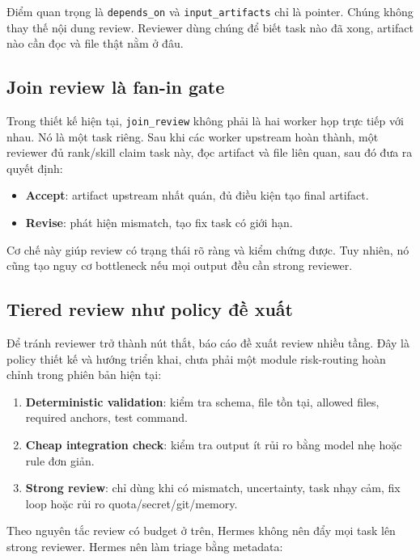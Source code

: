 \documentclass[12pt,a4paper]{article}
\begin{document}
Điểm quan trọng là \texttt{depends\_on} và \texttt{input\_artifacts} chỉ là pointer. Chúng không thay thế nội dung review. Reviewer dùng chúng để biết task nào đã xong, artifact nào cần đọc và file thật nằm ở đâu.

\subsection{Join review là fan-in gate}

Trong thiết kế hiện tại, \texttt{join\_review} không phải là hai worker họp trực tiếp với nhau. Nó là một task riêng. Sau khi các worker upstream hoàn thành, một reviewer đủ rank/skill claim task này, đọc artifact và file liên quan, sau đó đưa ra quyết định:

\begin{itemize}
    \item \textbf{Accept}: artifact upstream nhất quán, đủ điều kiện tạo final artifact.
    \item \textbf{Revise}: phát hiện mismatch, tạo fix task có giới hạn.
\end{itemize}

Cơ chế này giúp review có trạng thái rõ ràng và kiểm chứng được. Tuy nhiên, nó cũng tạo nguy cơ bottleneck nếu mọi output đều cần strong reviewer.

\subsection{Tiered review như policy đề xuất}

Để tránh reviewer trở thành nút thắt, báo cáo đề xuất review nhiều tầng. Đây là policy thiết kế và hướng triển khai, chưa phải một module risk-routing hoàn chỉnh trong phiên bản hiện tại:

\begin{enumerate}
    \item \textbf{Deterministic validation}: kiểm tra schema, file tồn tại, allowed files, required anchors, test command.
    \item \textbf{Cheap integration check}: kiểm tra output ít rủi ro bằng model nhẹ hoặc rule đơn giản.
    \item \textbf{Strong review}: chỉ dùng khi có mismatch, uncertainty, task nhạy cảm, fix loop hoặc rủi ro quota/secret/git/memory.
\end{enumerate}

Theo nguyên tắc review có budget ở trên, Hermes không nên đẩy mọi task lên strong reviewer. Hermes nên làm triage bằng metadata:
\end{document}
